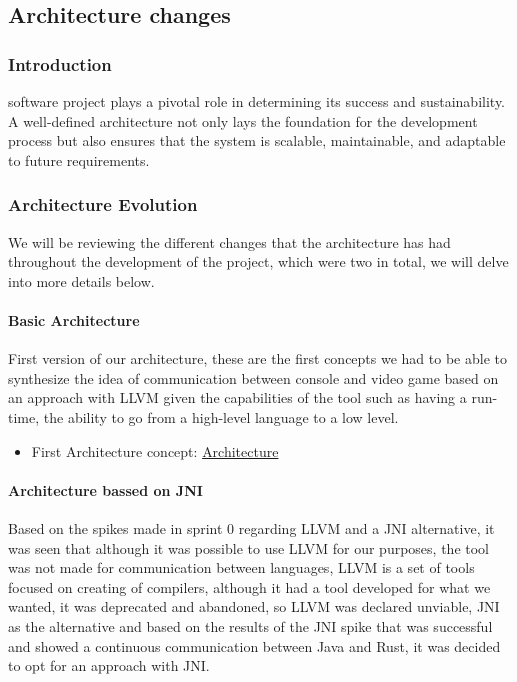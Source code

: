 \subsection{Architecture changes}

\subsubsection{Introduction}
software project plays a pivotal role in determining its success and sustainability. A well-defined architecture not only lays the foundation for the development process but also ensures that the system is scalable, maintainable, and adaptable to future requirements.
\subsubsection{Architecture Evolution}
We will be reviewing the different changes that the architecture has had throughout the development of the project, which were two in total, we will delve into more details below.
\paragraph{Basic Architecture}
First version of our architecture, these are the first concepts we had to be able to synthesize the idea of communication between console and video game based on an approach with LLVM given the capabilities of the tool such as having a run-time, the ability to go from a high-level language to a low level.

\begin{itemize}
    \item First Architecture concept: \href{https://github.com/Pending-Name-21/arquitecture/pull/1/files}{Architecture}
\end{itemize}

\paragraph{Architecture bassed on JNI}
Based on the spikes made in sprint 0 regarding LLVM and a JNI alternative, it was seen that although it was possible to use LLVM for our purposes, the tool was not made for communication between languages, LLVM is a set of tools focused on creating of compilers, although it had a tool developed for what we wanted, it was deprecated and abandoned, so LLVM was declared unviable, JNI as the alternative and based on the results of the JNI spike that was successful and showed a continuous communication between Java and Rust, it was decided to opt for an approach with JNI.

